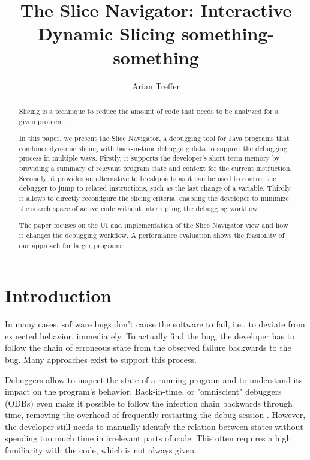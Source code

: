 ﻿\documentclass[
      english,
			conference,
      ]{IEEEtran}
\title{The Slice Navigator: Interactive Dynamic Slicing something-something}
\author{Arian Treffer}
\begin{document}
\maketitle

\begin{abstract}
Slicing is a technique to reduce the amount of code that needs to be analyzed for a given problem.

In this paper, we present the Slice Navigator, a debugging tool for Java programs that combines dynamic slicing with back-in-time debugging data to support the debugging process in multiple ways.
Firstly, it supports the developer's short term memory by providing a summary of relevant program state and context for the current instruction.
Secondly, it provides an alternative to breakpoints as it can be used to control the debugger to jump to related instructions, such as the last change of a variable.
Thirdly, it allows to directly reconfigure the slicing criteria, enabling the developer to minimize the search space of active code without interrupting the debugging workflow.

The paper focuses on the UI and implementation of the Slice Navigator view and how it changes the debugging workflow.
A performance evaluation shows the feasibility of our approach for larger programs.

\end{abstract}

\section{Introduction}
\label{sec:introduction}

In many cases, software bugs don't cause the software to fail, i.e., to deviate from expected behavior, immediately.
To actually find the bug, the developer has to follow the chain of erroneous state from the observed failure backwards to the bug.
Many approaches exist to support this process.

Debuggers allow to inspect the state of a running program and to understand its impact on the program's behavior.
Back-in-time, or "omniscient" debuggers (ODBs) even make it possible to follow the infection chain backwards through time, removing the overhead of frequently restarting the debug session \cite{lewis_debugging_2003}.
However, the developer still needs to manually identify the relation between states without spending too much time in irrelevant parts of code.
This often requires a high familiarity with the code, which is not always given.
%
\end{document}
